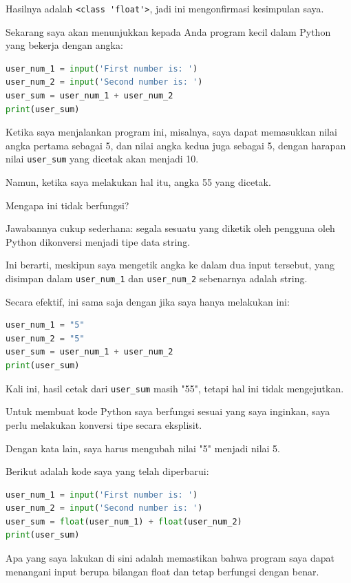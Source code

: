 \documentclass{article}
\begin{document}
Hasilnya adalah \verb|<class 'float'>|, jadi ini mengonfirmasi kesimpulan saya.

Sekarang saya akan menunjukkan kepada Anda program kecil dalam Python yang bekerja dengan angka:

\begin{lstlisting}[language=Python, caption={}, captionpos=b]
user_num_1 = input('First number is: ')
user_num_2 = input('Second number is: ')
user_sum = user_num_1 + user_num_2
print(user_sum)
\end{lstlisting}

Ketika saya menjalankan program ini, misalnya, saya dapat memasukkan nilai angka pertama sebagai 5, dan nilai angka kedua juga sebagai 5, dengan harapan nilai \verb|user_sum| yang dicetak akan menjadi 10.

Namun, ketika saya melakukan hal itu, angka 55 yang dicetak.

Mengapa ini tidak berfungsi?

Jawabannya cukup sederhana: segala sesuatu yang diketik oleh pengguna oleh Python dikonversi menjadi tipe data string.

Ini berarti, meskipun saya mengetik angka ke dalam dua input tersebut, yang disimpan dalam \verb|user_num_1| dan \verb|user_num_2| sebenarnya adalah string.

Secara efektif, ini sama saja dengan jika saya hanya melakukan ini:
\begin{lstlisting}[language=Python, caption={}, captionpos=b]
user_num_1 = "5"
user_num_2 = "5"
user_sum = user_num_1 + user_num_2
print(user_sum)
\end{lstlisting}

Kali ini, hasil cetak dari \verb|user_sum| masih "55", tetapi hal ini tidak mengejutkan.

Untuk membuat kode Python saya berfungsi sesuai yang saya inginkan, saya perlu melakukan konversi tipe secara eksplisit.

Dengan kata lain, saya harus mengubah nilai "5" menjadi nilai 5.

Berikut adalah kode saya yang telah diperbarui:

\begin{lstlisting}[language=Python, caption={}, captionpos=b]
user_num_1 = input('First number is: ')
user_num_2 = input('Second number is: ')
user_sum = float(user_num_1) + float(user_num_2)
print(user_sum)
\end{lstlisting}

Apa yang saya lakukan di sini adalah memastikan bahwa program saya dapat menangani input berupa bilangan float dan tetap berfungsi dengan benar.
\end{document}
